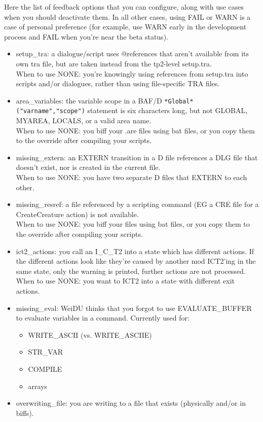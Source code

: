 \documentclass{article}
\begin{document}
Here the list of feedback options that you can configure, along with use cases when you
should deactivate them. In all other cases, using FAIL or WARN is a case of personal
preference (for example, use WARN early in the development process and FAIL when you're
near the beta status).
\begin{itemize}
\item setup_tra: a dialogue/script uses @references that aren't available from
     its own tra file, but are taken instead from the tp2-level setup.tra.
     \\
     When to use NONE: you're knowingly using references from
     setup.tra into scripts and/or dialogues, rather than using file-specific TRA files.
\item area_variables: the variable scope in a BAF/D \verb+*Global*("varname","scope")+
     statement is six characters long, but not GLOBAL, MYAREA, LOCALS, or a valid area name.
     \\
     When to use NONE: you biff your .are files using bat files, or you copy them to
		 the override after compiling your scripts.
\item missing_extern: an EXTERN transition in a D file references a DLG file that
     doesn't exist, nor is created in the current file.
     \\
     When to use NONE: you have two separate D files that EXTERN to each other.
\item missing_resref: a file referenced by a scripting command (EG a CRE file for a
     CreateCreature action) is not available.
     \\
     When to use NONE: you biff your files using bat files, or you copy them to
		 the override after compiling your scripts.
\item ict2_actions: you call an I_C_T2 into a state which has different actions.
		 If the different actions look like they're caused by another mod ICT2'ing in
		 the same state, only the warning is printed, further actions are not processed.
     \\
     When to use NONE: you want to ICT2 into a state with different exit actions.
\item missing_eval: WeiDU thinks that you forgot to use EVALUATE_BUFFER to evaluate
     variables in a command. Currently used for:
     \begin{itemize}
     \item WRITE_ASCII (vs. WRITE_ASCIIE)
     \item STR_VAR
     \item COMPILE
     \item arrays
     \end{itemize}
\item overwriting_file: you are writing to a file that exists (physically and/or in biffs).
\end{itemize}
\end{document}
